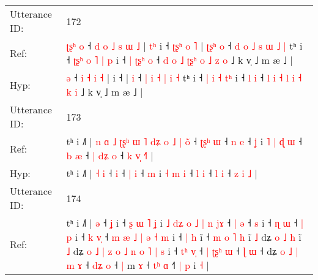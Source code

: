 \documentclass[10pt]{article}
\DeclareRobustCommand{\hl}[1]{{\textcolor{red}{#1}}}
\begin{document}
\begin{longtable}{ll}
 \\
\midrule
Utterance ID: & 172 \\
Ref: & \hl{ʈ}\hl{ʂ}\hl{ʰ}\hl{ }\hl{o} ˧\hl{ }\hl{d}\hl{ }\hl{o} \hl{˩} \hl{s} \hl{ɯ} \hl{˩} |\hl{ }\hl{t}\hl{ʰ} i ˧\hl{ }\hl{ʈ}\hl{ʂ}\hl{ʰ}\hl{ }\hl{o}\hl{ }\hl{˥} |\hl{ }\hl{ʈ}\hl{ʂ}\hl{ʰ} \hl{o} ˧\hl{ }\hl{d} \hl{o} \hl{˩} \hl{s} \hl{ɯ} \hl{˩} \hl{|} tʰ i ˧ \hl{ʈ}\hl{ʂ}\hl{ʰ} \hl{o} \hl{˥} \hl{|}\hl{ }\hl{p} i ˧\hl{ }\hl{|} \hl{ʈ}\hl{ʂ}\hl{ʰ} \hl{o} ˧ \hl{d} \hl{o} \hl{˩} \hl{ʈ}\hl{ʂ}\hl{ʰ} \hl{o} \hl{˩} \hl{z} \hl{o} ˩ k v̩ ˩ m æ ˩ |
 \\
Hyp: & \hl{}\hl{}\hl{}\hl{}\hl{ə} ˧\hl{}\hl{}\hl{}\hl{} \hl{i} \hl{˧} \hl{i} \hl{˧} |\hl{}\hl{}\hl{} i ˧\hl{}\hl{}\hl{}\hl{}\hl{}\hl{}\hl{}\hl{} |\hl{}\hl{}\hl{}\hl{} \hl{i} ˧\hl{}\hl{} \hl{|} \hl{i} \hl{˧} \hl{|} \hl{i} \hl{˧} tʰ i ˧ \hl{}\hl{}\hl{|} \hl{i} \hl{˧} \hl{}\hl{t}\hl{ʰ} i ˧\hl{}\hl{} \hl{}\hl{}\hl{l} \hl{i} ˧ \hl{l} \hl{i} \hl{˧} \hl{}\hl{}\hl{l} \hl{i} \hl{˧} \hl{k} \hl{i} ˩ k v̩ ˩ m æ ˩ |
 \\
\midrule
Utterance ID: & 173 \\
Ref: & tʰ i ˩˥ |\hl{ }\hl{n}\hl{ }\hl{ɑ}\hl{ }\hl{˩}\hl{ }\hl{ʈ}\hl{ʂ}\hl{ʰ}\hl{ }\hl{ɯ}\hl{ }\hl{˥}\hl{ }\hl{d}\hl{ʑ}\hl{ }\hl{o}\hl{ }\hl{˩} \hl{|} \hl{o}\hl{̃} ˧\hl{ }\hl{ʈ}\hl{ʂ}\hl{ʰ} \hl{ɯ} ˧ \hl{n} \hl{e} ˧ \hl{ʝ} i\hl{ }\hl{˥} \hl{|} \hl{ɖ} \hl{ɯ} ˧ \hl{b} \hl{æ} ˧\hl{ }\hl{|} \hl{d}\hl{ʑ} \hl{o} ˧ \hl{k} \hl{v}\hl{̩} \hl{˧}\hl{˥} |
 \\
Hyp: & tʰ i ˩˥ |\hl{}\hl{}\hl{}\hl{}\hl{}\hl{}\hl{}\hl{}\hl{}\hl{}\hl{}\hl{}\hl{}\hl{}\hl{}\hl{}\hl{}\hl{}\hl{}\hl{}\hl{} \hl{˧} \hl{}\hl{i} ˧\hl{}\hl{}\hl{}\hl{} \hl{i} ˧ \hl{|} \hl{i} ˧ \hl{m} i\hl{}\hl{} \hl{˧} \hl{m} \hl{i} ˧ \hl{l} \hl{i} ˧\hl{}\hl{} \hl{}\hl{l} \hl{i} ˧ \hl{z} \hl{}\hl{i} \hl{}\hl{˩} |
 \\
\midrule
Utterance ID: & 174 \\
Ref: & tʰ i ˩˥ |\hl{ }\hl{ə} ˧\hl{ }\hl{ʝ} i ˧\hl{ }\hl{ʂ}\hl{ }\hl{ɯ}\hl{ }\hl{˥}\hl{ }\hl{ʝ} i\hl{ }\hl{˩}\hl{ }\hl{d}\hl{ʑ}\hl{ }\hl{o}\hl{ }\hl{˩}\hl{ }\hl{|} \hl{n} \hl{j}\hl{ɤ} ˧\hl{ }\hl{|} \hl{ə} ˧\hl{ }\hl{s} i ˧\hl{ }\hl{ɳ} \hl{ɯ} ˧ \hl{|} \hl{p} i ˧\hl{ }\hl{k} \hl{v}\hl{̩} ˧\hl{ }\hl{m} \hl{æ}\hl{ }\hl{˩} \hl{|} \hl{ə} \hl{˧}\hl{ }\hl{m} i ˧ \hl{|}\hl{ }\hl{h} i\hl{̃} ˧\hl{ }\hl{m}\hl{ }\hl{o} \hl{˥}\hl{ }\hl{h} i\hl{̃} \hl{˩} dʑ\hl{ }\hl{o}\hl{ }\hl{˩}\hl{ }\hl{h} i\hl{̃} \hl{˩} dʑ\hl{ }\hl{o}\hl{ }\hl{˩}\hl{ }\hl{|} \hl{z} \hl{o} \hl{˩}\hl{ }\hl{n} \hl{o} \hl{˥} \hl{|}\hl{ }\hl{s} i ˧ \hl{t}\hl{ʰ} \hl{v}\hl{̩} ˧\hl{ }\hl{|} \hl{ʈ}\hl{ʂ}\hl{ʰ} \hl{ɯ} ˧ \hl{}\hl{ɭ} \hl{ɯ} ˧ dʑ \hl{o} \hl{˩} \hl{|}\hl{ }\hl{m} \hl{ɤ} ˧ \hl{d}\hl{ʑ} \hl{o} ˧\hl{ }\hl{|} m \hl{ɤ} ˧ \hl{t}\hl{ʰ} \hl{ɑ} ˧\hl{˥}\hl{ }\hl{|} \hl{p} i \hl{˧} |

\end{longtable}
\end{document}
